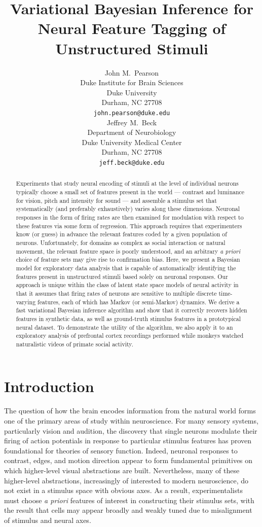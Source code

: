 \documentclass{article} %
\title{Variational Bayesian Inference for Neural Feature Tagging of Unstructured Stimuli}
\author{
John M.~Pearson\\
Duke Institute for Brain Sciences \\
Duke University\\
Durham, NC 27708 \\
\texttt{john.pearson@duke.edu} \\
\And
Jeffrey M.~Beck \\
Department of Neurobiology \\
Duke University Medical Center \\
Durham, NC 27708 \\
\texttt{jeff.beck@duke.edu} \\
}
\begin{document}
\maketitle

\begin{abstract}
Experiments that study neural encoding of stimuli at the level of individual neurons typically choose a small set of features present in the world --- contrast and luminance for vision, pitch and intensity for sound --- and assemble a stimulus set that systematically (and preferably exhaustively) varies along these dimensions. Neuronal responses in the form of firing rates are then examined for modulation with respect to these features via some form of regression. This approach requires that experimenters know (or guess) in advance the relevant features coded by a given population of neurons. Unfortunately, for domains as complex as social interaction or natural movement, the relevant feature space is poorly understood, and an arbitrary \emph{a priori} choice of feature sets may give rise to confirmation bias. Here, we present a Bayesian model for exploratory data analysis that is capable of automatically identifying the features present in unstructured stimuli based solely on neuronal responses. Our approach is unique within the class of latent state space models of neural activity in that it assumes that firing rates of neurons are sensitive to multiple discrete time-varying features, each of which has Markov (or semi-Markov) dynamics. We derive a fast variational Bayesian inference algorithm and show that it correctly recovers hidden features in synthetic data, as well as ground-truth stimulus features in a prototypical neural dataset. To demonstrate the utility of the algorithm, we also apply it to an exploratory analysis of prefrontal cortex recordings performed while monkeys watched naturalistic videos of primate social activity.
\end{abstract}

\section{Introduction}
The question of how the brain encodes information from the natural world forms one of the primary areas of study within neuroscience. For many sensory systems, particularly vision and audition, the discovery that single neurons modulate their firing of action potentials in response to particular stimulus features has proven foundational for theories of sensory function. Indeed, neuronal responses to contrast, edges, and motion direction appear to form fundamental primitives on which higher-level visual abstractions are built. Nevertheless, many of these higher-level abstractions, increasingly of interested to modern neuroscience, do not exist in a stimulus space with obvious axes. As a result, experimentalists must choose \emph{a priori} features of interest in constructing their stimulus sets, with the result that cells may appear broadly and weakly tuned due to misalignment of stimulus and neural axes.
\end{document}
